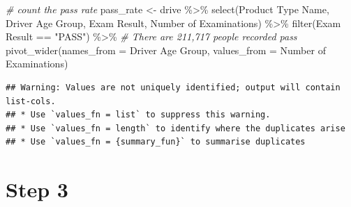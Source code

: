 \documentclass[11pt,a4paper,]{article}
\newenvironment{Shaded}{\begin{snugshade}}{\end{snugshade}}
\newcommand{\AttributeTok}[1]{\textcolor[rgb]{0.77,0.63,0.00}{#1}}
\newcommand{\CommentTok}[1]{\textcolor[rgb]{0.56,0.35,0.01}{\textit{#1}}}
\newcommand{\FunctionTok}[1]{\textcolor[rgb]{0.00,0.00,0.00}{#1}}
\newcommand{\NormalTok}[1]{#1}
\newcommand{\OtherTok}[1]{\textcolor[rgb]{0.56,0.35,0.01}{#1}}
\newcommand{\SpecialCharTok}[1]{\textcolor[rgb]{0.00,0.00,0.00}{#1}}
\newcommand{\StringTok}[1]{\textcolor[rgb]{0.31,0.60,0.02}{#1}}
\begin{document}
\begin{Shaded}
\begin{Highlighting}[]
\CommentTok{\# count the pass rate }
\NormalTok{pass\_rate }\OtherTok{\textless{}{-}}\NormalTok{ drive }\SpecialCharTok{\%\textgreater{}\%}
  \FunctionTok{select}\NormalTok{(}\StringTok{\textasciigrave{}}\AttributeTok{Product Type Name}\StringTok{\textasciigrave{}}\NormalTok{, }\StringTok{\textasciigrave{}}\AttributeTok{Driver Age Group}\StringTok{\textasciigrave{}}\NormalTok{, }\StringTok{\textasciigrave{}}\AttributeTok{Exam Result}\StringTok{\textasciigrave{}}\NormalTok{, }\StringTok{\textasciigrave{}}\AttributeTok{Number of Examinations}\StringTok{\textasciigrave{}}\NormalTok{) }\SpecialCharTok{\%\textgreater{}\%}
  \FunctionTok{filter}\NormalTok{(}\StringTok{\textasciigrave{}}\AttributeTok{Exam Result}\StringTok{\textasciigrave{}} \SpecialCharTok{==} \StringTok{"PASS"}\NormalTok{) }\SpecialCharTok{\%\textgreater{}\%}
\CommentTok{\# There are 211,717 people recorded pass}
  \FunctionTok{pivot\_wider}\NormalTok{(}\AttributeTok{names\_from =} \StringTok{\textasciigrave{}}\AttributeTok{Driver Age Group}\StringTok{\textasciigrave{}}\NormalTok{,}
              \AttributeTok{values\_from =} \StringTok{\textasciigrave{}}\AttributeTok{Number of Examinations}\StringTok{\textasciigrave{}}\NormalTok{)}
\end{Highlighting}
\end{Shaded}

\begin{verbatim}
## Warning: Values are not uniquely identified; output will contain list-cols.
## * Use `values_fn = list` to suppress this warning.
## * Use `values_fn = length` to identify where the duplicates arise
## * Use `values_fn = {summary_fun}` to summarise duplicates
\end{verbatim}

\section*{Step 3}

\printbibliography
\end{document}
